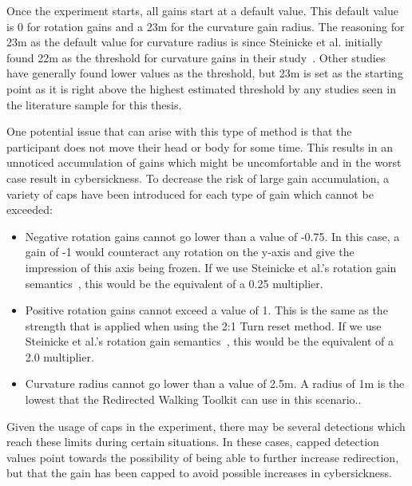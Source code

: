 Once the experiment starts, all gains start at a default value. This default value is 0 for rotation gains and a 23m for the curvature gain radius. The reasoning for 23m as the default value for curvature radius is since Steinicke et al. initially found 22m as the threshold for curvature gains in their study~\cite{5072212}. Other studies have generally found lower values as the threshold, but 23m is set as the starting point as it is right above the highest estimated threshold by any studies seen in the literature sample for this thesis.

One potential issue that can arise with this type of method is that the participant does not move their head or body for some time. This results in an unnoticed accumulation of gains which might be uncomfortable and in the worst case result in cybersickness. To decrease the risk of large gain accumulation, a variety of caps have been introduced for each type of gain which cannot be exceeded:
\begin{itemize}
    \item Negative rotation gains cannot go lower than a value of -0.75. In this case, a gain of -1 would counteract any rotation on the y-axis and give the impression of this axis being frozen. If we use Steinicke et al.'s rotation gain semantics~\cite{5072212}, this would be the equivalent of a 0.25 multiplier. 
    \item Positive rotation gains cannot exceed a value of 1. This is the same as the strength that is applied when using the 2:1 Turn reset method. If we use Steinicke et al.'s rotation gain semantics~\cite{5072212}, this would be the equivalent of a 2.0 multiplier. 
    \item Curvature radius cannot go lower than a value of 2.5m. A radius of 1m is the lowest that the Redirected Walking Toolkit can use in this scenario.. 
\end{itemize}

Given the usage of caps in the experiment, there may be several detections which reach these limits during certain situations. In these cases, capped detection values point towards the possibility of being able to further increase redirection, but that the gain has been capped to avoid possible increases in cybersickness.
   
